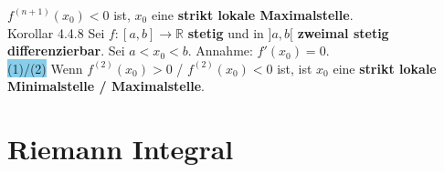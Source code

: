 \documentclass[landscape, 10pt]{article}
\newcommand{\R}{\mathbb{R}}
\begin{document}
\begin{multicols}{3}
{                            $f^{(n+1)}(x_0)<0$} ist,
                            \textcolor{NavyBlue}{$x_0$} eine 
                            \textbf{strikt lokale 
                            Maximalstelle}. \\
              \colorbox{BurntOrange}{Korollar 4.4.8} 
                     Sei \textcolor{NavyBlue}{
                     $f:[a,b]\longrightarrow\R$} 
                     \textbf{stetig} und in 
                     \textcolor{NavyBlue}{$]a,b[$}
                     \textbf{zweimal stetig 
                     differenzierbar}. Sei 
                     \textcolor{NavyBlue}{$a<x_0<b$}. 
                     Annahme: \textcolor{NavyBlue}{$f'(x_0)=0$}.\\
                     \colorbox{SkyBlue}{(1)/(2)} 
                            Wenn \textcolor{NavyBlue}{
                            $f^{(2)}(x_0)>0$} /
                            \textcolor{NavyBlue}{
                            $f^{(2)}(x_0)<0$} ist, ist 
                            \textcolor{NavyBlue}{$x_0$}
                            eine \textbf{strikt lokale 
                            Minimalstelle / Maximalstelle}.
\section{Riemann Integral}

\end{multicols}
\end{document}
